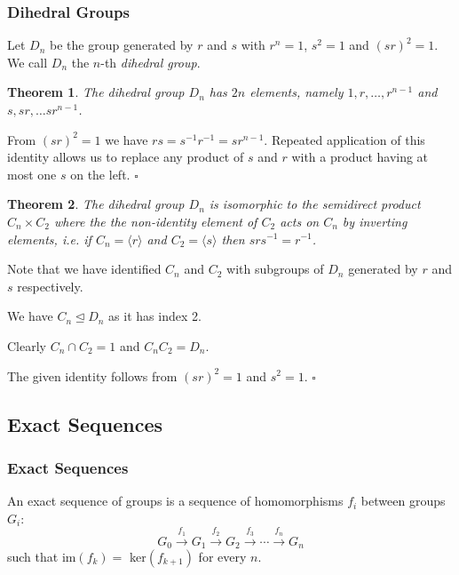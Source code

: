 \documentclass[10pt]{article}
\newtheorem{theorem}{Theorem}[section]
\newenvironment{proof}[1][Proof]{\begin{trivlist}
\item[\hskip \labelsep {\itshape #1}]}{\end{trivlist}}
\newenvironment{definition}[1][Definition]{\begin{trivlist}
\item[\hskip \labelsep {\bfseries #1}]}{\end{trivlist}}
\begin{document}
\subsubsection{Dihedral Groups}

\begin{definition}
Let $D_n$ be the group generated by $r$ and $s$ with $r^n = 1$, $s^2 = 1$ and $(sr)^2 = 1$. We call $D_n$ the $n$-th \emph{dihedral group}.
\end{definition}

\begin{theorem}
The dihedral group $D_n$ has $2n$ elements, namely $1, r, \ldots, r^{n-1}$ and $s, sr, \ldots sr^{n-1}$.
\end{theorem}

\begin{proof}
From $(sr)^2 = 1$ we have $rs = s^{-1}r^{-1} = sr^{n-1}$. Repeated application of this identity allows us to replace any product of $s$ and $r$ with a product having at most one $s$ on the left. $\square$
\end{proof}

\begin{theorem}
The dihedral group $D_n$ is isomorphic to the semidirect product $C_n\times C_2$ where the the non-identity element of $C_2$ acts on $C_n$ by inverting elements, i.e. if $C_n = \langle r \rangle$ and $C_2 = \langle s \rangle$ then $srs^{-1} = r^{-1}$.
\end{theorem}

\begin{proof}
Note that we have identified $C_n$ and $C_2$ with subgroups of $D_n$ generated by $r$ and $s$ respectively.

We have $C_n \mathrel{\unlhd} D_n$ as it has index 2.

Clearly $C_n\cap C_2 = 1$ and $C_nC_2 = D_n$.

The given identity follows from $(sr)^2 = 1$ and $s^2 = 1$. $\square$
\end{proof}

\subsection{Exact Sequences}

\subsubsection{Exact Sequences}

\begin{definition}
An exact sequence of groups is a sequence of homomorphisms $f_i$ between groups $G_i$:
$$G_0 \overset{f_1}{\longrightarrow} G_1 \overset{f_2}{\longrightarrow} G_{2} \overset{f_{3}}{\longrightarrow} \cdots \overset{f_n}{\to} G_n$$
such that im$(f_k) =$ ker$(f_{k+1})$ for every $n$.
\end{definition}
\end{document}
